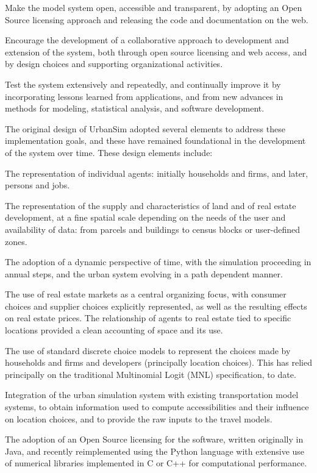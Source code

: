 \item Make the model system open, accessible and transparent, by adopting an Open Source licensing approach and releasing the code and documentation on the web.
\item Encourage the development of a collaborative approach to development and extension of the system, both through open source licensing and web access, and by design choices and supporting organizational activities.
\item Test the system extensively and repeatedly, and continually improve it by incorporating lessons learned from applications, and from new advances in methods for modeling, statistical analysis, and software development.
\squishend

\bigskip
The original design of UrbanSim adopted several elements to address these implementation goals, and these have remained foundational in the development of the system over time.  These design elements include:

\squishlist
\item The representation of individual agents: initially households and firms, and later, persons and jobs.
\item The representation of the supply and characteristics of land and of real estate development, at a fine spatial scale depending on the needs of the user and availability of data: from parcels and buildings to census blocks or user-defined zones.
\item   The adoption of a dynamic perspective of time, with the simulation proceeding in annual steps, and the urban system evolving in a path dependent manner.
\item   The use of real estate markets as a central organizing focus, with consumer choices and supplier choices explicitly represented, as well as the resulting effects on real estate prices.  The relationship of agents to real estate tied to specific locations provided a clean accounting of space and its use.
\item   The use of standard discrete choice models to represent the choices made by households and firms and developers (principally location choices).  This has relied principally on the traditional Multinomial Logit (MNL) specification, to date.
\item   Integration of the urban simulation system with existing transportation model systems, to obtain information used to compute accessibilities and their influence on location choices, and to provide the raw inputs to the travel models.
\item   The adoption of an Open Source licensing for the software, written originally in Java, and recently reimplemented using the Python language with extensive use of numerical libraries implemented in C or C++ for computational performance.
\squishend


